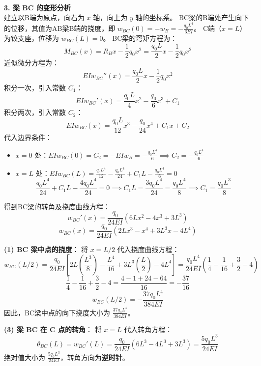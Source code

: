 \documentclass[11pt,a4paper]{ctexrep}
\begin{document}
{\textbf{3. 梁 BC 的变形分析} \\
建立以B端为原点，向右为 $x$ 轴，向上为 $y$ 轴的坐标系。
BC梁的B端处产生向下的位移，其值为AB梁B端的挠度，即 $w_{BC}(0) = -w_B = -\frac{q_0 L^4}{6EI}$。
C端（$x=L$）为铰支座，位移为 $w_{BC}(L) = 0$。
BC梁的弯矩方程为：
\[
    M_{BC}(x) = R_B x - \frac{1}{2}q_0 x^2 = \frac{q_0 L}{2} x - \frac{1}{2}q_0 x^2
\]
近似微分方程为：
\[
    EI w_{BC}''(x) = \frac{q_0 L}{2} x - \frac{1}{2}q_0 x^2
\]
积分一次，引入常数 $C_1$：
\[
    EI w_{BC}'(x) = \frac{q_0 L}{4} x^2 - \frac{q_0}{6} x^3 + C_1
\]
积分两次，引入常数 $C_2$：
\[
    EI w_{BC}(x) = \frac{q_0 L}{12} x^3 - \frac{q_0}{24} x^4 + C_1 x + C_2
\]
代入边界条件：
\begin{itemize}
    \item $x = 0$ 处：$EI w_{BC}(0) = C_2 = -EI w_B = -\frac{q_0 L^4}{6} \implies C_2 = -\frac{q_0 L^4}{6}$
    \item $x = L$ 处：$EI w_{BC}(L) = \frac{q_0 L^4}{12} - \frac{q_0 L^4}{24} + C_1 L - \frac{q_0 L^4}{6} = 0$
          \[
              \frac{q_0 L^4}{24} + C_1 L - \frac{4q_0 L^4}{24} = 0 \implies C_1 L = \frac{3q_0 L^4}{24} = \frac{q_0 L^4}{8} \implies C_1 = \frac{q_0 L^3}{8}
          \]
\end{itemize}
得到BC梁的转角及挠度曲线方程：
\[
    w_{BC}'(x) = \frac{q_0}{24 EI} \left( 6 L x^2 - 4 x^3 + 3 L^3 \right)
\]
\[
    w_{BC}(x) = \frac{q_0}{24 EI} \left( 2 L x^3 - x^4 + 3 L^3 x - 4 L^4 \right)
\]

\textbf{(1) BC 梁中点的挠度}：
将 $x = L/2$ 代入挠度曲线方程：
\[
    w_{BC}(L/2) = \frac{q_0}{24 EI} \left[ 2 L \left(\frac{L^3}{8}\right) - \frac{L^4}{16} + 3 L^3 \left(\frac{L}{2}\right) - 4 L^4 \right] 
    = \frac{q_0 L^4}{24 EI} \left( \frac{1}{4} - \frac{1}{16} + \frac{3}{2} - 4 \right)
\]
\[
    \frac{1}{4} - \frac{1}{16} + \frac{3}{2} - 4 = \frac{4 - 1 + 24 - 64}{16} = -\frac{37}{16}
\]
\[
    w_{BC}(L/2) = -\frac{37 q_0 L^4}{384 EI}
\]
因此，BC梁中点的向下挠度大小为 \textbf{$\frac{37 q_0 L^4}{384 EI}$}。

\textbf{(3) 梁 BC 在 C 点的转角}：
将 $x = L$ 代入转角方程：
\[
    \theta_{BC}(L) = w_{BC}'(L) = \frac{q_0}{24 EI} \left( 6 L^3 - 4 L^3 + 3 L^3 \right) = \frac{5 q_0 L^3}{24 EI}
\]
绝对值大小为 \textbf{$\frac{5 q_0 L^3}{24 EI}$}，转角方向为\textbf{逆时针}。

}
\end{document}
